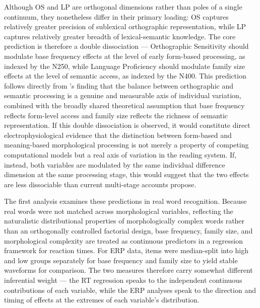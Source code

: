 \documentclass[utf8]{FrontiersinHarvard} %
\begin{document}
	Although OS and LP are orthogonal dimensions rather than poles of a single continuum, they nonetheless differ in their primary loading: OS captures relatively greater precision of sublexical orthographic representation, while LP captures relatively greater breadth of lexical-semantic knowledge. The core prediction is therefore a double dissociation --- Orthographic Sensitivity should modulate base frequency effects at the level of early form-based processing, as indexed by the N250, while Language Proficiency should modulate family size effects at the level of semantic access, as indexed by the N400. This prediction follows directly from \citeauthor{andrewsMorphologicalPrimingStronger2013}'s \citeyearpar{andrewsMorphologicalPrimingStronger2013} finding that the balance between orthographic and semantic processing is a genuine and measurable axis of individual variation, combined with the broadly shared theoretical assumption that base frequency reflects form-level access and family size reflects the richness of semantic representation. If this double dissociation is observed, it would constitute direct electrophysiological evidence that the distinction between form-based and meaning-based morphological processing is not merely a property of competing computational models but a real axis of variation in the reading system. If, instead, both variables are modulated by the same individual difference dimension at the same processing stage, this would suggest that the two effects are less dissociable than current multi-stage accounts propose.
	
	The first analysis examines these predictions in real word recognition. Because real words were not matched across morphological variables, reflecting the naturalistic distributional properties of morphologically complex words rather than an orthogonally controlled factorial design, base frequency, family size, and morphological complexity are treated as continuous predictors in a regression framework for reaction times. For ERP data, items were median-split into high and low groups separately for base frequency and family size to yield stable waveforms for comparison. The two measures therefore carry somewhat different inferential weight --- the RT regression speaks to the independent continuous contributions of each variable, while the ERP analyses speak to the direction and timing of effects at the extremes of each variable's distribution.
	
\end{document}
